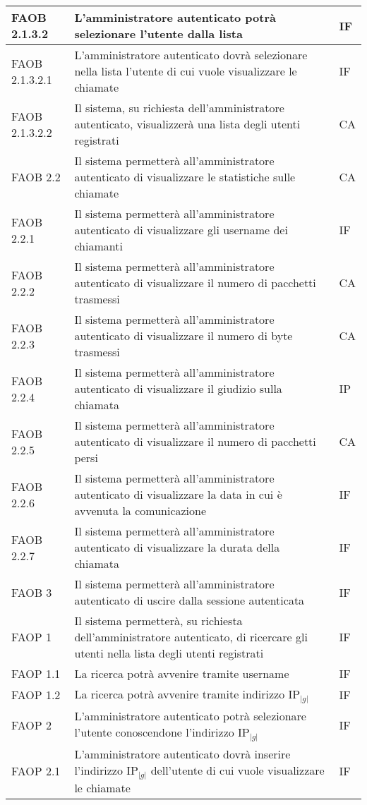 \begin{longtable}{p{} p{} p{} }
\midrule
FAOB 2.1.3.2 & L'amministratore autenticato potrà selezionare l'utente dalla lista & IF\\
\midrule
FAOB 2.1.3.2.1 & L'amministratore autenticato dovrà selezionare nella lista l'utente di cui vuole visualizzare le chiamate & IF\\
\midrule
FAOB 2.1.3.2.2 & Il sistema, su richiesta dell'amministratore autenticato, visualizzerà una lista degli utenti registrati & CA\\

\midrule
FAOB 2.2 & Il sistema permetterà all'amministratore autenticato di visualizzare le statistiche sulle chiamate & CA\\
\midrule
FAOB 2.2.1 & Il sistema permetterà all'amministratore autenticato di visualizzare gli username dei chiamanti & IF\\
\midrule
FAOB 2.2.2 & Il sistema permetterà all'amministratore autenticato di visualizzare il numero di pacchetti trasmessi & CA\\
\midrule
FAOB 2.2.3 & Il sistema permetterà all'amministratore autenticato di visualizzare il numero di byte trasmessi & CA\\
\midrule
FAOB 2.2.4 & Il sistema permetterà all'amministratore autenticato di visualizzare il giudizio sulla chiamata & IP\\
\midrule
FAOB 2.2.5 & Il sistema permetterà all'amministratore autenticato di visualizzare il numero di pacchetti persi & CA\\
\midrule
FAOB 2.2.6 & Il sistema permetterà all'amministratore autenticato di visualizzare la data in cui è avvenuta la comunicazione & IF\\
\midrule
FAOB 2.2.7 & Il sistema permetterà all'amministratore autenticato di visualizzare la durata della chiamata & IF\\

\midrule
FAOB 3 & Il sistema permetterà all'amministratore autenticato di uscire dalla sessione autenticata & IF\\

\midrule
FAOP 1 & Il sistema permetterà, su richiesta dell'amministratore autenticato, di ricercare gli utenti nella lista degli utenti registrati & IF\\
\midrule
FAOP 1.1 & La ricerca potrà avvenire tramite username & IF\\
\midrule
FAOP 1.2 & La ricerca potrà avvenire tramite indirizzo IP$_{|g|}$ & IF\\
\midrule
FAOP 2 & L'amministratore autenticato potrà selezionare l'utente conoscendone l'indirizzo IP$_{|g|}$ & IF\\
\midrule
FAOP 2.1 & L'amministratore autenticato dovrà inserire l'indirizzo IP$_{|g|}$ dell'utente di cui vuole visualizzare le chiamate & IF\\
\end{longtable}
\newpage

